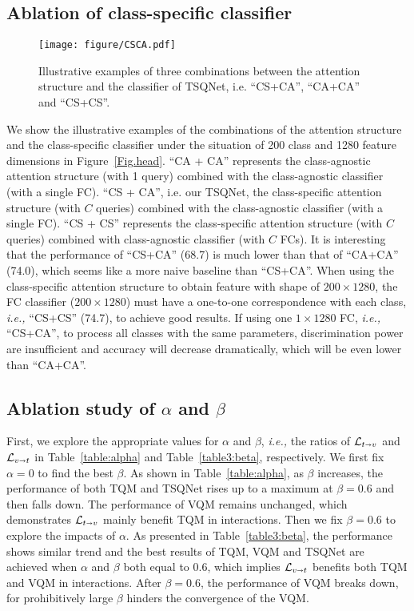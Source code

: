 \documentclass[runningheads]{llncs}
\newcommand{\tabref}[1]{Table~\ref{#1}}
\begin{document}
\subsection{Ablation of class-specific classifier}
\begin{figure}[h] \centering \texttt{[image: figure/CSCA.pdf]} \caption{Illustrative examples of three combinations between the attention structure and the classifier of TSQNet, {i.e.} ``CS+CA'', ``CA+CA'' and ``CS+CS''.} 

\end{figure}
We show the illustrative examples of the combinations of the attention structure and the class-specific classifier under the situation of 200 class and 1280 feature dimensions in Figure~\ref{Fig.head}. ``CA + CA'' represents the class-agnostic attention structure (with 1 query) combined with the class-agnostic classifier (with a single FC). ``CS + CA'', {i.e.} our TSQNet, the class-specific attention structure (with $C$ queries) combined with the class-agnostic classifier (with a single FC). ``CS + CS'' represents the class-specific attention structure (with $C$ queries) combined with class-agnostic classifier (with $C$ FCs).
It is interesting that the performance of ``CS+CA'' (68.7) is much lower than that of ``CA+CA'' (74.0), which seems like a more naive baseline than ``CS+CA''. When using the class-specific attention structure to obtain feature with shape of $200\times1280$, the FC classifier ($200\times1280$) must have a one-to-one correspondence with each class, \emph{i.e., } ``CS+CS'' (74.7), to achieve good results. If using one $1\times1280$ FC, \emph{i.e., } ``CS+CA'', to process all classes with the same parameters, discrimination power are insufficient and accuracy will decrease dramatically, which will be even lower than ``CA+CA''.

\subsection{Ablation study of $\alpha$ and $\beta$}
First, we explore the appropriate values for $\alpha$ and $\beta$, \emph{i.e.,} the ratios of $\mathcal{L}_{t\shortrightarrow v}$ and $\mathcal{L}_{v\shortrightarrow t}$ in \tabref{table:alpha} and \tabref{table3:beta}, respectively. We first fix $\alpha =0 $ to find the best $\beta$. As shown in \tabref{table:alpha}, as $\beta$ increases, the performance of both TQM and TSQNet rises up to a maximum at $\beta=0.6$ and then falls down. The performance of VQM remains unchanged, which demonstrates $\mathcal{L}_{t\shortrightarrow v}$ mainly benefit TQM in interactions. Then we fix $\beta=0.6$ to explore the impacts of $\alpha$.  As presented in \tabref{table3:beta}, the performance shows similar trend and the best results of TQM, VQM and TSQNet are achieved when $\alpha$ and $\beta$ both equal to 0.6, which implies $\mathcal{L}_{v\shortrightarrow t}$  benefits both TQM and VQM in interactions. After $\beta=0.6$, the performance of VQM breaks down, for prohibitively large $\beta$ hinders the convergence of the VQM. 
\end{document}
